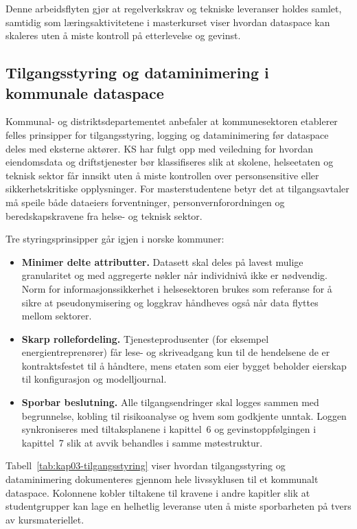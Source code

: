 Denne arbeidsflyten gjør at regelverkskrav og tekniske leveranser holdes samlet, samtidig som læringsaktivitetene i masterkurset viser
hvordan dataspace kan skaleres uten å miste kontroll på etterlevelse og gevinst.

\subsection{Tilgangsstyring og dataminimering i kommunale dataspace}
Kommunal- og distriktsdepartementet anbefaler at kommunesektoren etablerer felles prinsipper for tilgangsstyring, logging og
dataminimering før dataspace deles med eksterne aktører.\citep{kdd2023datadeling} KS har fulgt opp med veiledning for hvordan
eiendomsdata og driftstjenester bør klassifiseres slik at skolene, helseetaten og teknisk sektor får innsikt uten å miste
kontrollen over personsensitive eller sikkerhetskritiske opplysninger.\citep{ks2024eiendomsdrift} For masterstudentene betyr
det at tilgangsavtaler må speile både dataeiers forventninger, personvernforordningen og beredskapskravene fra helse- og
teknisk sektor.

Tre styringsprinsipper går igjen i norske kommuner:
\begin{itemize}
    \item \textbf{Minimer delte attributter.} Datasett skal deles på lavest mulige granularitet og med aggregerte nøkler når
    individnivå ikke er nødvendig. Norm for informasjonssikkerhet i helsesektoren brukes som referanse for å sikre at
    pseudonymisering og loggkrav håndheves også når data flyttes mellom sektorer.\citep{norm2023}
    \item \textbf{Skarp rollefordeling.} Tjenesteprodusenter (for eksempel energientreprenører) får lese- og skriveadgang kun til
    de hendelsene de er kontraktsfestet til å håndtere, mens etaten som eier bygget beholder eierskap til konfigurasjon og
    modelljournal.
    \item \textbf{Sporbar beslutning.} Alle tilgangsendringer skal logges sammen med begrunnelse, kobling til risikoanalyse og
    hvem som godkjente unntak. Loggen synkroniseres med tiltaksplanene i kapittel~6 og gevinstoppfølgingen i kapittel~7 slik at
    avvik behandles i samme møtestruktur.
\end{itemize}

Tabell~\ref{tab:kap03-tilgangsstyring} viser hvordan tilgangsstyring og dataminimering dokumenteres gjennom hele livssyklusen til
et kommunalt dataspace. Kolonnene kobler tiltakene til kravene i andre kapitler slik at studentgrupper kan lage en helhetlig
leveranse uten å miste sporbarheten på tvers av kursmateriellet.

